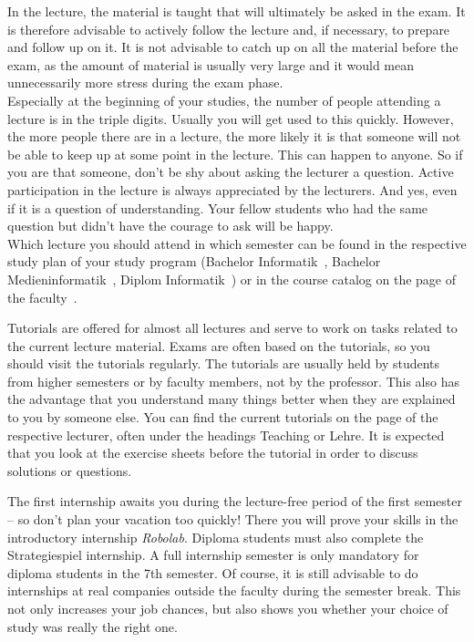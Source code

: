 In the lecture, the material is taught that will ultimately be asked in the exam. It is therefore advisable to actively follow the lecture and, if necessary, to prepare and follow up on it. It is not advisable to catch up on all the material before the exam, as the amount of material is usually very large and it would mean unnecessarily more stress during the exam phase.
\\
Especially at the beginning of your studies, the number of people attending a lecture is in the triple digits. Usually you will get used to this quickly. However, the more people there are in a lecture, the more likely it is that someone will not be able to keep up at some point in the lecture. This can happen to anyone. So if you are that someone, don't be shy about asking the lecturer a question. Active participation in the lecture is always appreciated by the lecturers. And yes, even if it is a question of understanding. Your fellow students who had the same question but didn't have the courage to ask will be happy. \\
Which lecture you should attend in which semester can be found in the respective study plan of your study program
(Bachelor Informatik~, Bachelor Medieninformatik~, Diplom Informatik~) or in the course catalog on the page of the faculty~. 



Tutorials are offered for almost all lectures and serve to work on tasks related to the current lecture material. Exams are often based on the tutorials, so you should visit the tutorials regularly. The tutorials are usually held by students from higher semesters or by faculty members, not by the professor. This also has the advantage that you understand many things better when they are explained to you by someone else. You can find the current tutorials on the page of the respective lecturer, often under the headings Teaching or Lehre. It is expected that you look at the exercise sheets before the tutorial in order to discuss solutions or questions.



The first internship awaits you during the lecture-free period of the first semester -- so don't plan your vacation too quickly! There you will prove your skills in the introductory internship \textit{Robolab}. Diploma students must also complete the Strategiespiel internship. A full internship semester is only mandatory for diploma students in the 7th semester. Of course, it is still advisable to do internships at real companies outside the faculty during the semester break. This not only increases your job chances, but also shows you whether your choice of study was really the right one.

